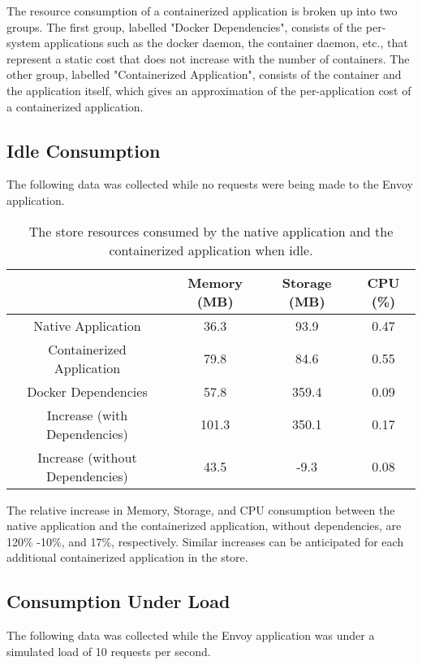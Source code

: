 \documentclass{article}
\begin{document}
The resource consumption of a containerized application is broken up into two groups. The first group, labelled "Docker Dependencies", consists of the per-system applications such as the docker daemon, the container daemon, etc., that represent a static cost that does not increase with the number of containers. The other group, labelled "Containerized Application", consists of the container and the application itself, which gives an approximation of the per-application cost of a containerized application.

\subsection{Idle Consumption}
The following data was collected while no requests were being made to the Envoy application.

\begin{table}[h!]
\begin{tabular}{ |c|c|c|c| }
 \hline
   & Memory (MB) & Storage (MB) & CPU (\%) \\ 
 \hline
 Native Application & 36.3 & 93.9 & 0.47 \\
 \hline
 Containerized Application & 79.8 & 84.6 & 0.55 \\
 \hline
 Docker Dependencies & 57.8 & 359.4 & 0.09 \\
 \hline\hline
 Increase (with Dependencies) & 101.3 & 350.1 & 0.17 \\
 \hline
 Increase (without Dependencies) & 43.5 & -9.3 & 0.08 \\
 \hline
\end{tabular}
\caption{The store resources consumed by the native application and the containerized application when idle.}
\label{table:1}
\end{table}

The relative increase in Memory, Storage, and CPU consumption between the native application and the containerized application, without dependencies, are 120\% -10\%, and 17\%, respectively. Similar increases can be anticipated for each additional containerized application in the store.

\subsection{Consumption Under Load}
The following data was collected while the Envoy application was under a simulated load of 10 requests per second.
\end{document}
